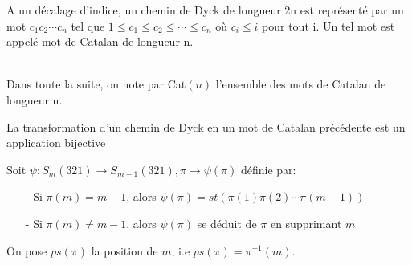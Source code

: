 
\begin{definition}
	\begin{rm}
		A un décalage d'indice, un chemin de Dyck de longueur 2n est représenté par un mot $c_{1}c_{2}
			\cdots c_{n}$ tel que $1 \leq c_{1} \leq c_{2} \leq \cdots \leq c_{n}$ où $c_{i} \leq i$ pour
		tout i. Un tel mot est appelé mot de Catalan de longueur n.
	\end{rm}
\end{definition}
\newpage
\text{}\\
Dans toute la suite, on note par \rm{Cat}$(n)$ l'ensemble des mots de Catalan  de longueur n.
\begin{lemme}
	La transformation d'un chemin de \rm{Dyck} en un mot de \rm{Catalan} précédente est un application bijective
\end{lemme}


\begin{definition} \label{psiDef_}
	\begin{rm}
		Soit $\psi: S_{m}(321)\longrightarrow S_{m-1}(321), \pi \longrightarrow \psi(\pi)$ définie par:
		\begin{itemize}
			\item [-] Si $\pi(m)=m-1$, alors $\psi(\pi)=st(\pi(1)\pi(2)\cdots \pi(m-1))$
			\item [-] Si $\pi(m)\neq m-1$, alors $\psi(\pi)$ se déduit de $\pi$ en supprimant $m$
		\end{itemize}
		On pose $ps(\pi)$ la position de $m$, i.e $ps(\pi)=\pi^{-1}(m)$.
	\end{rm}
\end{definition}

